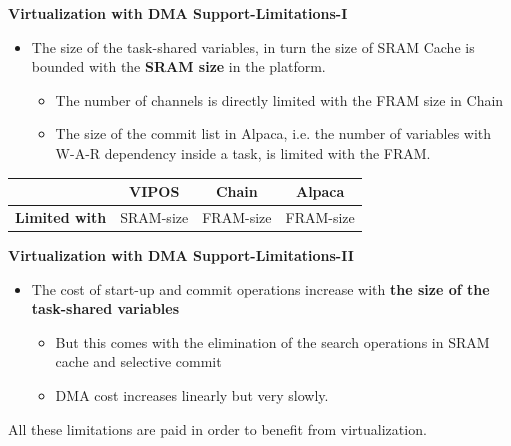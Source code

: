 

\begin{frame}{\textbf{Virtualization with DMA Support-Limitations-I}}
	
	\begin{itemize}
			\item The size of the task-shared variables, in turn the size of SRAM Cache is bounded with the \textbf{SRAM size} in the platform.
			\begin{itemize}
				\item The number of channels is directly limited with the FRAM size in Chain
				\item The size of the commit list in Alpaca, i.e. the number of variables with W-A-R dependency inside a task, is limited with the FRAM.
			\end{itemize}
	\end{itemize}

\centering
\begin{block}{}
	\centering
	\begin{tabular}{ l c | c | c }
	& VIPOS & Chain & Alpaca \\
	\hline
	\textbf{Limited with} & SRAM-size & FRAM-size & FRAM-size
\end{tabular}
\end{block}
	
\end{frame}


\begin{frame}{\textbf{Virtualization with DMA Support-Limitations-II}}

\begin{itemize}

		\item The cost of start-up and commit operations increase with \textbf{the size of the task-shared variables}
		\begin{itemize}
			\item But this comes with the elimination of the search operations in SRAM cache and selective commit
			\item DMA cost increases linearly but very slowly.
		\end{itemize}
\end{itemize}	
All these limitations are paid in order to benefit from virtualization.

\end{frame}

